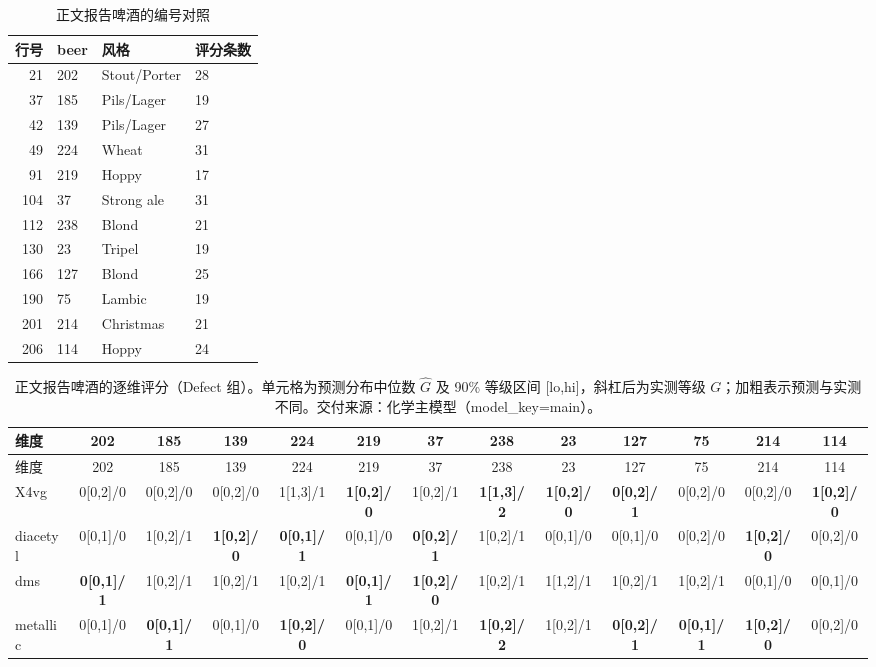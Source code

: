 \begin{landscape}
\scriptsize
\begin{table}[h]
\centering
\caption{正文报告啤酒的编号对照}\label{tab:q1_report_beers_map_defect}
\begin{tabular}{rlll}
\toprule
行号 & beer & 风格 & 评分条数 \\
\midrule
21 & 202 & Stout/Porter & 28 \\
37 & 185 & Pils/Lager & 19 \\
42 & 139 & Pils/Lager & 27 \\
49 & 224 & Wheat & 31 \\
91 & 219 & Hoppy & 17 \\
104 & 37 & Strong ale & 31 \\
112 & 238 & Blond & 21 \\
130 & 23 & Tripel & 19 \\
166 & 127 & Blond & 25 \\
190 & 75 & Lambic & 19 \\
201 & 214 & Christmas & 21 \\
206 & 114 & Hoppy & 24 \\
\bottomrule
\end{tabular}
\end{table}
\begin{longtable}{lcccccccccccc}
\caption{正文报告啤酒的逐维评分（Defect 组）。单元格为预测分布中位数 $\hat G$ 及 90\% 等级区间 [lo,hi]，斜杠后为实测等级 $G$；加粗表示预测与实测不同。交付来源：化学主模型（model\_key=main）。}\label{tab:q1_report_beers_defect}\\
\toprule
维度 & 202 & 185 & 139 & 224 & 219 & 37 & 238 & 23 & 127 & 75 & 214 & 114 \\
\midrule
\endfirsthead
\toprule
维度 & 202 & 185 & 139 & 224 & 219 & 37 & 238 & 23 & 127 & 75 & 214 & 114 \\
\midrule
\endhead
\bottomrule
\endfoot
X4vg & 0[0,2]/0 & 0[0,2]/0 & 0[0,2]/0 & 1[1,3]/1 & \textbf{1[0,2]/0} & 1[0,2]/1 & \textbf{1[1,3]/2} & \textbf{1[0,2]/0} & \textbf{0[0,2]/1} & 0[0,2]/0 & 0[0,2]/0 & \textbf{1[0,2]/0} \\
diacetyl & 0[0,1]/0 & 1[0,2]/1 & \textbf{1[0,2]/0} & \textbf{0[0,1]/1} & 0[0,1]/0 & \textbf{0[0,2]/1} & 1[0,2]/1 & 0[0,1]/0 & 0[0,1]/0 & 0[0,2]/0 & \textbf{1[0,2]/0} & 0[0,2]/0 \\
dms & \textbf{0[0,1]/1} & 1[0,2]/1 & 1[0,2]/1 & 1[0,2]/1 & \textbf{0[0,1]/1} & \textbf{1[0,2]/0} & 1[0,2]/1 & 1[1,2]/1 & 1[0,2]/1 & 1[0,2]/1 & 0[0,1]/0 & 0[0,1]/0 \\
metallic & 0[0,1]/0 & \textbf{0[0,1]/1} & 0[0,1]/0 & \textbf{1[0,2]/0} & 0[0,1]/0 & 1[0,2]/1 & \textbf{1[0,2]/2} & 1[0,2]/1 & \textbf{0[0,2]/1} & \textbf{0[0,1]/1} & \textbf{1[0,2]/0} & 0[0,2]/0 \\

\end{longtable}
\end{landscape}
